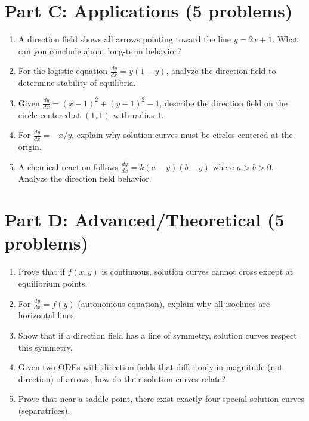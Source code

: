 \documentclass[12pt]{article}
\begin{document}
\section*{Part C: Applications (5 problems)}

\begin{enumerate}[resume]
\item A direction field shows all arrows pointing toward the line $y = 2x + 1$. What can you conclude about long-term behavior?

\item For the logistic equation $\frac{dy}{dx} = y(1-y)$, analyze the direction field to determine stability of equilibria.

\item Given $\frac{dy}{dx} = (x-1)^2 + (y-1)^2 - 1$, describe the direction field on the circle centered at $(1,1)$ with radius $1$.

\item For $\frac{dy}{dx} = -x/y$, explain why solution curves must be circles centered at the origin.

\item A chemical reaction follows $\frac{dy}{dx} = k(a-y)(b-y)$ where $a > b > 0$. Analyze the direction field behavior.
\end{enumerate}

\section*{Part D: Advanced/Theoretical (5 problems)}

\begin{enumerate}[resume]
\item Prove that if $f(x,y)$ is continuous, solution curves cannot cross except at equilibrium points.

\item For $\frac{dy}{dx} = f(y)$ (autonomous equation), explain why all isoclines are horizontal lines.

\item Show that if a direction field has a line of symmetry, solution curves respect this symmetry.

\item Given two ODEs with direction fields that differ only in magnitude (not direction) of arrows, how do their solution curves relate?

\item Prove that near a saddle point, there exist exactly four special solution curves (separatrices).
\end{enumerate}
\end{document}
